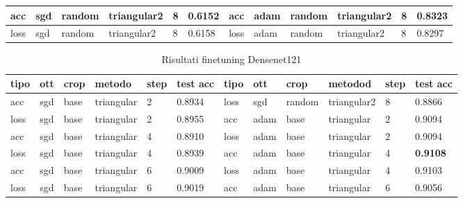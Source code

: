 \begin{table}[H]
\begin{adjustbox}{width=1\textwidth}
\begin{tabular}{|l|l|l|l|l|l||l|l|l|l|l|l|}
acc           & sgd          & random        & triangular2     & 8             & 0.6152            & acc           & adam         & random        & triangular2     & 8             & 0.8323            \\ \hline
loss          & sgd          & random        & triangular2     & 8             & 0.6158            & loss          & adam         & random        & triangular2     & 8             & 0.8297            \\ \hline
\end{tabular}
\end{adjustbox}
\label{t_res_resnet}
\end{table}

\begin{table}[H]
\centering
\caption{Risultati finetuning Densenet121}
\begin{adjustbox}{width=1\textwidth}
\begin{tabular}{|l|l|l|l|l|l||l|l|l|l|l|l|}
\hline
\textbf{tipo} & \textbf{ott} & \textbf{crop} & \textbf{metodo} & \textbf{step} & \textbf{test acc} & \textbf{tipo} & \textbf{ott} & \textbf{crop} & \textbf{metodod} & \textbf{step} & \textbf{test acc} \\ \hline
acc           & sgd          & base          & triangular       & 2             & 0.8934            & loss          & sgd          & random        & triangular2      & 8             & 0.8866            \\ \hline
loss          & sgd          & base          & triangular       & 2             & 0.8955            & acc           & adam         & base          & triangular       & 2             & 0.9094            \\ \hline
acc           & sgd          & base          & triangular       & 4             & 0.8910            & loss          & adam         & base          & triangular       & 2             & 0.9094            \\ \hline
loss          & sgd          & base          & triangular       & 4             & 0.8939            & acc           & adam         & base          & triangular       & 4             & \textbf{0.9108}   \\ \hline
acc           & sgd          & base          & triangular       & 6             & 0.9009            & loss          & adam         & base          & triangular       & 4             & 0.9103            \\ \hline
loss          & sgd          & base          & triangular       & 6             & 0.9019            & acc           & adam         & base          & triangular       & 6             & 0.9056            \\ \hline

\end{tabular}
\end{adjustbox}
\end{table}
